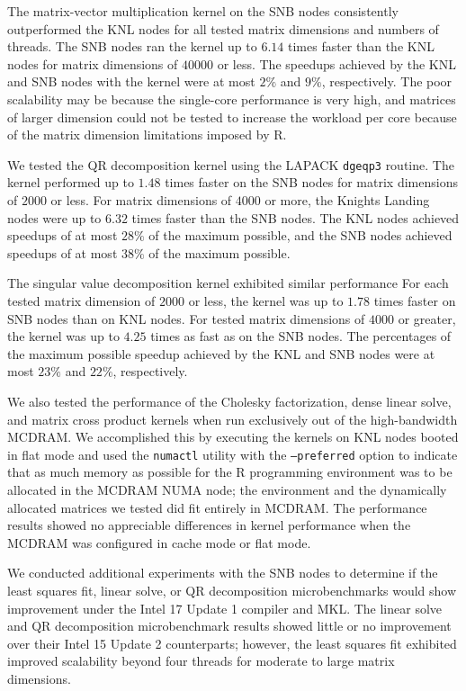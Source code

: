The matrix-vector multiplication kernel on the SNB nodes consistently
  outperformed the KNL nodes for all tested matrix dimensions and numbers of
  threads.
The SNB nodes ran the kernel up to $6.14$ times faster than the KNL nodes for
  matrix dimensions of $40000$ or less.
The speedups achieved by the KNL and SNB nodes with the kernel were at most
  $2\%$ and $9\%$, respectively.
The poor scalability may be because the single-core performance is very high,
  and matrices of larger dimension could not be tested to increase the workload
  per core because of the matrix dimension limitations imposed by R.

We tested the QR decomposition kernel using the LAPACK \texttt{dgeqp3}
  routine.
The kernel performed up to $1.48$ times faster on the SNB nodes for
  matrix dimensions of $2000$ or less.
For matrix dimensions of $4000$ or more, the Knights Landing nodes were up to
  $6.32$ times faster than the SNB nodes.
The KNL nodes achieved speedups of at most $28\%$ of the maximum possible, and
  the SNB nodes achieved speedups of at most $38\%$ of the maximum possible.

The singular value decomposition kernel exhibited similar performance
For each tested matrix dimension of $2000$ or less, the kernel was
  up to $1.78$ times faster on SNB nodes than on KNL nodes.
For tested matrix dimensions of $4000$ or greater, the kernel was up to $4.25$
  times as fast as on the SNB nodes.
The percentages of the maximum possible speedup achieved by the KNL
  and SNB nodes were at most $23\%$ and $22\%$, respectively.

We also tested the performance of the Cholesky factorization, dense linear
  solve, and matrix cross product kernels when run exclusively out of the
  high-bandwidth MCDRAM.
We accomplished this by executing the kernels on KNL nodes booted in
  flat mode and used the \texttt{numactl} utility with the \texttt{--preferred}
  option to indicate that as much memory as possible for the R programming
  environment was to be allocated in the MCDRAM NUMA node; the environment and
  the dynamically allocated matrices we tested did fit entirely in MCDRAM.
The performance results showed no appreciable differences
  in kernel performance when the MCDRAM was configured in cache mode or flat
  mode.

We conducted additional experiments with the SNB nodes to determine if
  the least squares fit, linear solve, or QR decomposition microbenchmarks
  would show improvement under the Intel 17 Update 1 compiler and MKL.
The linear solve and QR decomposition microbenchmark results showed little
  or no improvement over their Intel 15 Update 2 counterparts; however, the
  least squares fit exhibited improved scalability beyond four threads
  for moderate to large matrix dimensions.

